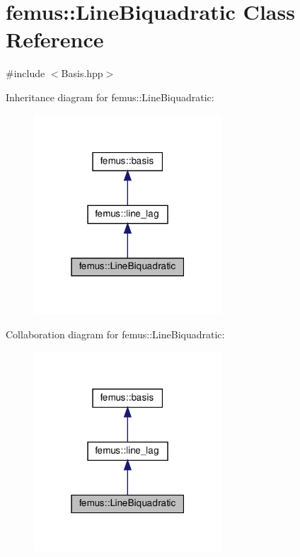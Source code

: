 \hypertarget{classfemus_1_1_line_biquadratic}{}\section{femus\+:\+:Line\+Biquadratic Class Reference}
\label{classfemus_1_1_line_biquadratic}


{\ttfamily \#include $<$Basis.\+hpp$>$}



Inheritance diagram for femus\+:\+:Line\+Biquadratic\+:
\nopagebreak
\begin{figure}[H]
\begin{center}
\leavevmode
\includegraphics[width=199pt]{classfemus_1_1_line_biquadratic__inherit__graph}
\end{center}
\end{figure}


Collaboration diagram for femus\+:\+:Line\+Biquadratic\+:
\nopagebreak
\begin{figure}[H]
\begin{center}
\leavevmode
\includegraphics[width=199pt]{classfemus_1_1_line_biquadratic__coll__graph}
\end{center}
\end{figure}
